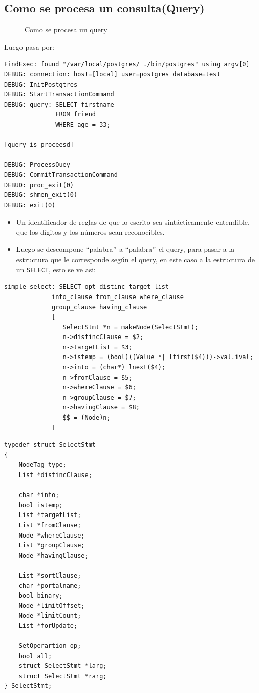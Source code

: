 \subsection{Como se procesa un consulta(Query)}
\begin{figure}[H]
\centering
{}
\caption{Como se procesa un query \cite{postgresqlpordentro}} 
\label{fig:comoprocesaquery2}
\end{figure}

Luego pasa por:
 
\lstset{language=sql,breaklines=true}
\begin{lstlisting}
FindExec: found "/var/local/postgres/ ./bin/postgres" using argv[0]
DEBUG: connection: host=[local] user=postgres database=test
DEBUG: InitPostgtres
DEBUG: StartTransactionCommand
DEBUG: query: SELECT firstname
			  FROM friend
			  WHERE age = 33;
			  
[query is proceesd]			  	

DEBUG: ProcessQuey
DEBUG: CommitTransactionCommand
DEBUD: proc_exit(0)
DEBUG: shmen_exit(0)
DEBUG: exit(0)
\end{lstlisting}
 
 \begin{itemize}
 \item Un identificador de reglas de que lo escrito sea sint\'acticamente entendible, que los d\'igitos y los n\'umeros sean reconocibles.
 \item Luego se descompone ``palabra$"$ a ``palabra$"$ el query, para pasar a la estructura que le corresponde seg\'un el query, en este caso a la estructura de un \texttt{SELECT}, esto se ve asi:
\end{itemize}
\lstset{language=sql,breaklines=true}
\label{fig:codigosqlc}
\begin{lstlisting}
simple_select: SELECT opt_distinc target_list
			 into_clause from_clause where_clause
			 group_clause having_clause
			 [
			 	SelectStmt *n = makeNode(SelectStmt);
			 	n->distincClause = $2;
			 	n->targetList = $3;
			 	n->istemp = (bool)((Value *| lfirst($4)))->val.ival;
			 	n->into = (char*) lnext($4);
			 	n->fromClause = $5;
			 	n->whereClause = $6;
				n->groupClause = $7;
				n->havingClause = $8;
				$$ = (Node)n;			 	
			 ]	
\end{lstlisting}

\lstset{language=c,breaklines=true}
\begin{lstlisting}
typedef struct SelectStmt
{
	NodeTag	type;
	List *distincClause;
	
	char *into;
	bool istemp;
	List *targetList;
	List *fromClause;
	Node *whereClause;
	List *groupClause;
	Node *havingClause;
	
	List *sortClause;
	char *portalname;
	bool binary;
	Node *limitOffset;
	Node *limitCount;
	List *forUpdate;
	
	SetOperartion op;
	bool all;
	struct SelectStmt *larg;
	struct SelectStmt *rarg;		
} SelectStmt;	
\end{lstlisting}

